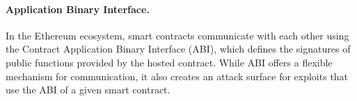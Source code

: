 \paragraph{Application Binary Interface.}
In the Ethereum ecosystem, smart contracts communicate with each other using the
Contract Application Binary Interface (ABI), which defines the signatures of
public functions provided by the hosted contract. While ABI offers a flexible
mechanism for communication, it also creates an attack surface for exploits that
use  the ABI of a given smart contract. 



